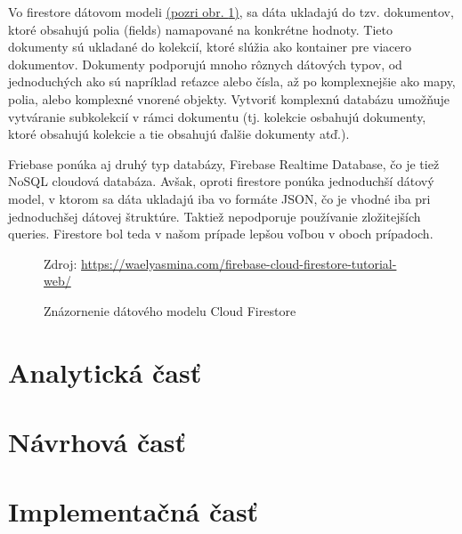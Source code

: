 Vo firestore dátovom modeli \hyperref[firestore]{(pozri obr. \ref{firestore})}, sa dáta ukladajú do tzv. dokumentov, ktoré obsahujú polia (fields) namapované na konkrétne hodnoty. Tieto dokumenty sú ukladané do kolekcií, ktoré slúžia ako kontainer pre viacero dokumentov. Dokumenty podporujú mnoho rôznych dátových typov, od jednoduchých ako sú napríklad reťazce alebo čísla, až po komplexnejšie ako mapy, polia, alebo komplexné vnorené objekty. Vytvoriť komplexnú databázu umožňuje vytváranie subkolekcií v rámci dokumentu (tj. kolekcie osbahujú dokumenty, ktoré obsahujú kolekcie a tie obsahujú ďalšie dokumenty atď.). \cite{firestoredoc}
  
Friebase ponúka aj druhý typ databázy, Firebase Realtime Database, čo je tiež NoSQL cloudová databáza. Avšak, oproti firestore ponúka jednoduchší dátový model, v ktorom sa dáta ukladajú iba vo formáte JSON, čo je vhodné iba pri jednoduchšej dátovej štruktúre. Taktiež nepodporuje používanie zložitejších queries. Firestore bol teda v našom prípade lepšou voľbou v oboch prípadoch. \\

\begin{figure}[!htbp]
  \centering  
  \def\stackalignment{c}
           {\scriptsize%
            Zdroj: \url{https://waelyasmina.com/firebase-cloud-firestore-tutorial-web/}}
	\caption{Znázornenie dátového modelu Cloud Firestore}  
  \label{firestore}
\end{figure}







\section{Analytická časť}
\section{Návrhová časť}
\section{Implementačná časť}









